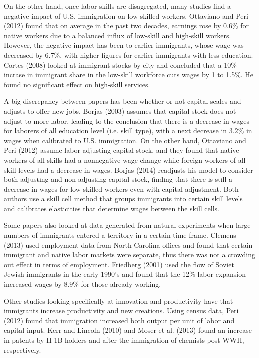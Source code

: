 \documentclass[11pt]{article}
\begin{document}
On the other hand, once labor skills are disagregated, many studies find a negative impact of U.S. immigration on low-skilled workers. Ottaviano and Peri (2012) \cite{ottaviano} found that on average in the past two decades, earnings rose by $0.6\%$ for native workers due to a balanced influx of low-skill and high-skill workers. However, the negative impact has been to earlier immigrants, whose wage was decreased by $6.7\%$, with higher figures for earlier immigrants with less education. Cortes (2008) \cite{cortes} looked at immigrant stocks by city and concluded that a 10$\%$ incrase in immigrant share in the low-skill workforce cuts wages by 1 to 1.5$\%$. He found no significant effect on high-skill services.

A big discrepancy between papers has been whether or not capital scales and adjusts to offer new jobs. Borjas (2003) \cite{borjas03} assumes that capital stock does not adjust to more labor, leading to the conclusion that there is a decrease in wages for laborers of all education level (i.e. skill type), with a next decrease in $3.2\%$ in wages when calibrated to U.S. immigration. On the other hand, Ottaviano and Peri (2012) \cite{ottaviano} assume labor-adjusting capital stock, and they found that native workers of all skills had a nonnegative wage change while foreign workers of all skill levels had a decrease in wages. Borjas (2014) \cite{borjas14} readjusts his model to consider both adjusting and non-adjusting capital stock, finding that there is still a decrease in wages for low-skilled workers even with capital adjustment. Both authors use a skill cell method that groups immigrants into certain skill levels and calibrates elasticities that determine wages between the skill cells.

Some papers also looked at data generated from natural experiments when large numbers of immigrants entered a territory in a certain time frame. Clemens (2013) \cite{clemens} used employment data from North Carolina offices and found that certain immigrant and native labor markets were separate, thus there was not a crowding out effect in terms of employment. Friedberg (2001) \cite{Friedberg} used the flow of Soviet Jewish immigrants in the early 1990's and found that the 12$\%$ labor expansion increased wages by $8.9\%$ for those already working.

Other studies looking specifically at innovation and productivity have that immigrants increase productivity and new creations. Using census data, Peri (2012) \cite{Peri} found that immigration increased both output per unit of labor and capital input. Kerr and Lincoln (2010) \cite{kerr} and Moser et al. (2013) \cite{moser} found an increase in patents by H-1B holders and after the immigration of chemists post-WWII, respectively.
\end{document}
